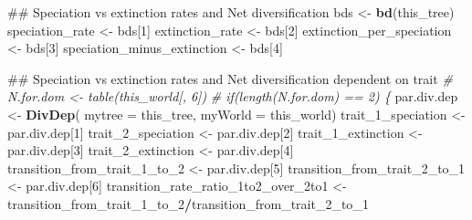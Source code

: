 \documentclass[]{book}
\newenvironment{Shaded}{\begin{snugshade}}{\end{snugshade}}
\newcommand{\KeywordTok}[1]{\textcolor[rgb]{0.13,0.29,0.53}{\textbf{{#1}}}}
\newcommand{\DataTypeTok}[1]{\textcolor[rgb]{0.13,0.29,0.53}{{#1}}}
\newcommand{\DecValTok}[1]{\textcolor[rgb]{0.00,0.00,0.81}{{#1}}}
\newcommand{\StringTok}[1]{\textcolor[rgb]{0.31,0.60,0.02}{{#1}}}
\newcommand{\CommentTok}[1]{\textcolor[rgb]{0.56,0.35,0.01}{\textit{{#1}}}}
\newcommand{\OperatorTok}[1]{\textcolor[rgb]{0.81,0.36,0.00}{\textbf{{#1}}}}
\newcommand{\NormalTok}[1]{{#1}}
\theoremstyle{definition}
\theoremstyle{definition}
\theoremstyle{definition}
\theoremstyle{remark}
\begin{document}
\begin{Shaded}
\begin{Highlighting}[]
\NormalTok{ ## Speciation vs extinction rates and Net diversification}
\NormalTok{bds <-}\StringTok{ }\KeywordTok{bd}\NormalTok{(this_tree)}
\NormalTok{speciation_rate <-}\StringTok{ }\NormalTok{bds[}\DecValTok{1}\NormalTok{]}
\NormalTok{extinction_rate <-}\StringTok{ }\NormalTok{bds[}\DecValTok{2}\NormalTok{]}
\NormalTok{extinction_per_speciation <-}\StringTok{ }\NormalTok{bds[}\DecValTok{3}\NormalTok{]}
\NormalTok{speciation_minus_extinction <-}\StringTok{ }\NormalTok{bds[}\DecValTok{4}\NormalTok{]}
\end{Highlighting}
\end{Shaded}

\begin{Shaded}
\begin{Highlighting}[]
\NormalTok{## Speciation vs extinction rates and Net diversification dependent on trait}
\CommentTok{# N.for.dom <- table(this_world[, 6])}
\CommentTok{#    if(length(N.for.dom) == 2) \{}
\NormalTok{par.div.dep <-}\StringTok{ }\KeywordTok{DivDep}\NormalTok{( }\DataTypeTok{mytree =}\NormalTok{ this_tree, }\DataTypeTok{myWorld =}\NormalTok{ this_world)}
\NormalTok{trait_1_speciation <-}\StringTok{ }\NormalTok{par.div.dep[}\DecValTok{1}\NormalTok{]}
\NormalTok{trait_2_speciation <-}\StringTok{ }\NormalTok{par.div.dep[}\DecValTok{2}\NormalTok{]}
\NormalTok{trait_1_extinction <-}\StringTok{ }\NormalTok{par.div.dep[}\DecValTok{3}\NormalTok{]}
\NormalTok{trait_2_extinction <-}\StringTok{ }\NormalTok{par.div.dep[}\DecValTok{4}\NormalTok{]}
\NormalTok{transition_from_trait_1_to_}\DecValTok{2}\NormalTok{ <-}\StringTok{ }\NormalTok{par.div.dep[}\DecValTok{5}\NormalTok{]}
\NormalTok{transition_from_trait_2_to_}\DecValTok{1}\NormalTok{ <-}\StringTok{ }\NormalTok{par.div.dep[}\DecValTok{6}\NormalTok{]}
\NormalTok{transition_rate_ratio_1to2_over_2to1 <-}\StringTok{ }\NormalTok{transition_from_trait_1_to_}\DecValTok{2}\OperatorTok{/}\NormalTok{transition_from_trait_2_to_}\DecValTok{1}
\end{Highlighting}
\end{Shaded}
\end{document}
